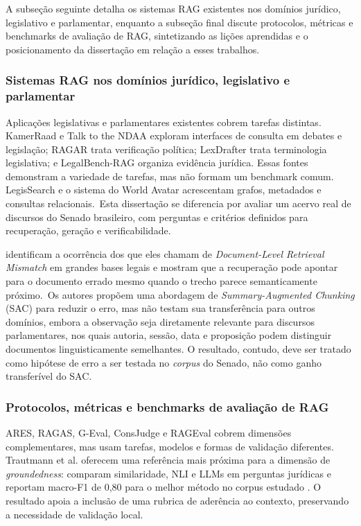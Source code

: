 A subseção seguinte detalha os sistemas RAG existentes nos domínios jurídico, legislativo e parlamentar, enquanto a subseção final discute protocolos, métricas e benchmarks de avaliação de RAG, sintetizando as lições aprendidas e o posicionamento da dissertação em relação a esses trabalhos.

\subsubsection{Sistemas RAG nos domínios jurídico, legislativo e parlamentar}

Aplicações legislativas e parlamentares existentes cobrem tarefas distintas. KamerRaad e Talk to the NDAA exploram interfaces de consulta em debates e legislação; RAGAR trata verificação política; LexDrafter trata terminologia legislativa; e LegalBench-RAG organiza evidência jurídica. Essas fontes demonstram a variedade de tarefas, mas não formam um benchmark comum. LegisSearch e o sistema do World Avatar acrescentam grafos, metadados e consultas relacionais.~Esta dissertação se diferencia por avaliar um acervo real de discursos do Senado brasileiro, com perguntas e critérios definidos para recuperação, geração e verificabilidade. 

\textcite{reuterEtAl2025reliableRetrieval} identificam a ocorrência dos que eles chamam de \textit{Document-Level Retrieval Mismatch} em grandes bases legais e mostram que a recuperação pode apontar para o documento errado mesmo quando o trecho parece semanticamente próximo.~Os autores propõem uma abordagem de \textit{Summary-Augmented Chunking} (SAC) para reduzir o erro, mas não testam sua transferência para outros domínios, embora a observação seja diretamente relevante para discursos parlamentares, nos quais autoria, sessão, data e proposição podem distinguir documentos linguisticamente semelhantes. O resultado, contudo, deve ser tratado como hipótese de erro a ser testada no \textit{corpus} do Senado, não como ganho transferível do SAC.

\subsubsection{Protocolos, métricas e benchmarks de avaliação de RAG}

ARES, RAGAS, G-Eval, ConsJudge e RAGEval cobrem dimensões complementares, mas usam tarefas, modelos e formas de validação diferentes. Trautmann et al. oferecem uma referência mais próxima para a dimensão de \textit{groundedness}: comparam similaridade, NLI e LLMs em perguntas jurídicas e reportam macro-F1 de 0,80 para o melhor método no corpus estudado \parencite{trautmannEtAl2024groundedness}. O resultado apoia a inclusão de uma rubrica de aderência ao contexto, preservando a necessidade de validação local. 


